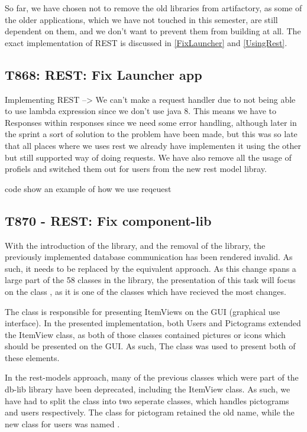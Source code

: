 So far, we have chosen not to remove the old libraries from artifactory, as some
of the older applications, which we have not touched in this semester, are still
dependent on them, and we don't want to prevent them from building at all. The
exact implementation of REST is discussed in \autoref{FixLauncher} and
\autoref{UsingRest}.

\subsection{T868: REST: Fix Launcher app}\label{FixLauncher}
Implementing REST --> We can't make a request handler due to not being able
to use lambda expression since we don't use java 8.
This means we have to Responses within responses since we need some error
handling, although later in the sprint a sort of solution to the problem have
been made, but this was so late that all places where we uses rest we already
have implementen it using the other but still supported way of doing requests.
We have also remove all the usage of profiels and switched them out for users
from the new rest model libray.

code show an example of how we use reqeuest


\subsection{T870 - REST: Fix component-lib}
With the introduction of the  library, and the removal of the
 library, the previously implemented database communication has
been rendered invalid. As such, it needs to be replaced by the equivalent
 approach. As this change spans a large part of the 58
classes in the  library, the presentation of this task will
focus on the class , as it is one of the
classes which have recieved the most changes.\nl

The  class is responsible for presenting ItemViews
on the GUI (graphical use interface). In the presented implementation, both
Users and Pictograms extended the ItemView class, as both of those classes
contained pictures or icons which should be presented on the GUI. As such, The
 class was used to present both of these
elements.\nl

In the rest-models approach, many of the previous classes which were part of
the db-lib library have been deprecated, including the ItemView class. As such,
we have had to split the  class into two seperate
classes, which handles pictograms and users respectively. The class for
pictogram retained the old name, while the new class for users was named
.\nl

